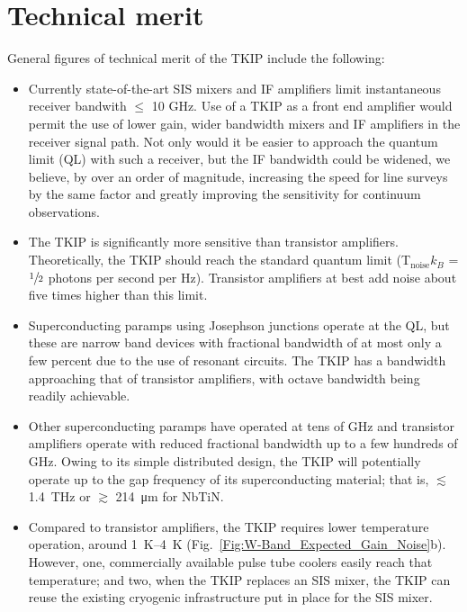 \section*{Technical merit}
General figures of technical merit of the TKIP include the following:

\begin{itemize}
\item Currently state-of-the-art  SIS mixers and IF amplifiers limit instantaneous receiver bandwith $\le$ 10 GHz. Use of a TKIP as a front end amplifier would permit the use of lower gain, wider bandwidth mixers and IF amplifiers in the receiver signal path.  Not only would it be easier to approach the quantum limit (QL) with such a receiver, but the IF bandwidth could be widened, we believe, by over an order of magnitude, increasing the speed for line surveys by the same factor and greatly improving the sensitivity for continuum observations.

\item The TKIP is significantly more sensitive than transistor amplifiers. Theoretically, the TKIP should reach the standard quantum limit (T$_\text{noise} k_B$ = $\sfrac{1}{2}$ photons per second per Hz). Transistor amplifiers at best add noise about five times higher than this limit.

\item Superconducting paramps using Josephson junctions operate at the QL, but these are narrow band devices with fractional bandwidth of at most only a few percent due to the use of resonant circuits. The TKIP has a bandwidth approaching that of transistor amplifiers, with octave bandwidth being readily achievable.

\item Other superconducting paramps have operated at tens of GHz and transistor amplifiers operate with reduced fractional bandwidth up to a few hundreds of GHz. Owing to its simple distributed design, the TKIP will potentially operate up to the gap frequency of its superconducting material; that is,  $\lesssim$ \SI{1.4}{THz} or $\gtrsim$ \SI{214}{\micro \meter} for NbTiN.

\item Compared to transistor amplifiers, the TKIP requires lower temperature operation, around \SIrange{1}{4}{\kelvin} (Fig.~\ref{Fig:W-Band_Expected_Gain_Noise}b). However, one, commercially available pulse tube coolers easily reach that temperature; and two, when the TKIP replaces an SIS mixer, the TKIP can reuse the existing cryogenic infrastructure put in place for the SIS mixer.
\end{itemize}

